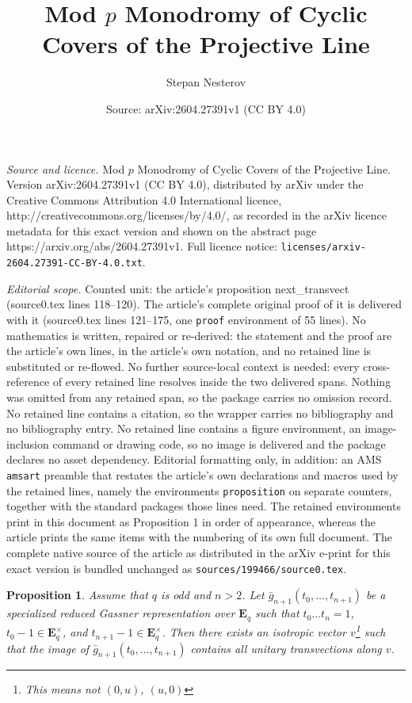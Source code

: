 \documentclass[10pt,a4paper]{amsart}
\title{Mod $p$ Monodromy of Cyclic Covers of the Projective Line}
\author{Stepan Nesterov}
\date{Source: arXiv:2604.27391v1 (CC BY 4.0)}
\newtheorem{proposition}{Proposition}
\begin{document}
\maketitle

\noindent\emph{Source and licence.} Mod $p$ Monodromy of Cyclic Covers of the Projective Line. Version arXiv:2604.27391v1 (CC BY 4.0), distributed by arXiv under the Creative Commons Attribution 4.0 International licence, http://creativecommons.org/licenses/by/4.0/, as recorded in the arXiv licence metadata for this exact version and shown on the abstract page https://arxiv.org/abs/2604.27391v1. Full licence notice: \texttt{licenses/arxiv-2604.27391-CC-BY-4.0.txt}.\par\smallskip

\noindent\textit{Editorial scope.} Counted unit: the article's proposition next\_transvect (source0.tex lines 118--120). The article's complete original proof of it is delivered with it (source0.tex lines 121--175, one \texttt{proof} environment of 55 lines). No mathematics is written, repaired or re-derived: the statement and the proof are the article's own lines, in the article's own notation, and no retained line is substituted or re-flowed.  No further source-local context is needed: every cross-reference of every retained line resolves inside the two delivered spans.  Nothing was omitted from any retained span, so the package carries no omission record.  No retained line contains a citation, so the wrapper carries no bibliography and no bibliography entry.  No retained line contains a figure environment, an image-inclusion command or drawing code, so no image is delivered and the package declares no asset dependency.  Editorial formatting only, in addition: an AMS \texttt{amsart} preamble that restates the article's own declarations and macros used by the retained lines, namely the environments \texttt{proposition} on separate counters, together with the standard packages those lines need.  The retained environments print in this document as Proposition 1 in order of appearance, whereas the article prints the same items with the numbering of its own full document.  The complete native source of the article as distributed in the arXiv e-print for this exact version is bundled unchanged as \texttt{sources/199466/source0.tex}.
	\begin{proposition} \label{next_transvect}
		Assume that $q$ is odd and $n > 2$. Let $\bar{g}_{n+1}(t_0, \ldots, t_{n+1})$ be a specialized reduced Gassner representation over $\mathbf{E}_q$ such that $t_0 \ldots t_n = 1$, $t_0 -1 \in \mathbf{E}_q^{\times}$, and $t_{n+1} - 1 \in \mathbf{E}_q^{\times}$. Then there exists an isotropic vector $v$\footnote{This means not $(0,u)$, $(u,0)$} such that the image of $\bar{g}_{n+1}(t_0, \ldots, t_{n+1})$ contains all unitary transvections along $v$.
	\end{proposition}
\end{document}
